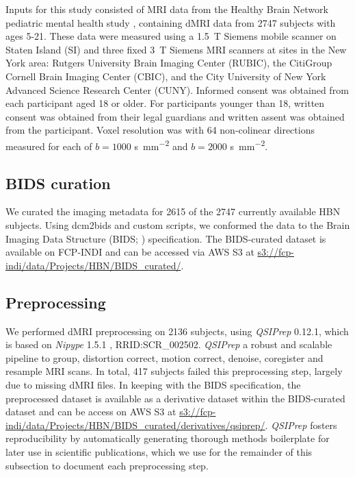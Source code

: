 \documentclass[fleqn,10pt]{wlscirep}
\begin{document}
Inputs for this study consisted of MRI data from the Healthy Brain Network
pediatric mental health study \cite{alexander2017-yc}, containing dMRI data from
\num{2747} subjects with ages 5-21. These data were measured using a
\qty{1.5}{\tesla} Siemens mobile scanner on Staten Island (SI) and three fixed
\qty{3}{\tesla} Siemens MRI scanners at sites in the New York area: Rutgers
University Brain Imaging Center (RUBIC), the CitiGroup Cornell Brain Imaging
Center (CBIC), and the City University of New York Advanced Science Research
Center (CUNY). Informed consent was obtained from each participant aged 18 or
older. For participants younger than 18, written consent was obtained from their
legal guardians and written assent was obtained from the participant. Voxel
resolution was  with \num{64} non-colinear
directions measured for each of $b=1000$ \unit{\second \per \mm^{2}} and
$b=2000$ \unit{\second \per \mm^{2}}.

\subsection*{BIDS curation}

We curated the imaging metadata for \num{2615} of the \num{2747} currently
available HBN subjects. Using dcm2bids and custom scripts, we conformed the data
to the Brain Imaging Data Structure (BIDS; \cite{gorgolewski2016-lh})
specification.  The BIDS-curated dataset is available on FCP-INDI and can be
accessed via AWS S3 at \url{s3://fcp-indi/data/Projects/HBN/BIDS_curated/}.


\subsection*{Preprocessing}

We performed dMRI preprocessing on \num{2136} subjects, using \emph{QSIPrep}
\cite{cieslak2021-iq} 0.12.1, which is based on \emph{Nipype} 1.5.1
\cite{nipype1,nipype2}, RRID:SCR\_002502. \emph{QSIPrep} a robust and scalable
pipeline to group, distortion correct, motion correct, denoise, coregister and
resample MRI scans.  In total, \num{417} subjects failed this preprocessing
step, largely due to missing dMRI files. In keeping with the BIDS specification,
the preprocessed dataset is available as a derivative dataset within the
BIDS-curated dataset and can be access on AWS S3 at
\url{s3://fcp-indi/data/Projects/HBN/BIDS_curated/derivatives/qsiprep/}.
\emph{QSIPrep} fosters reproducibility by automatically generating thorough
methods boilerplate for later use in scientific publications, which we use for
the remainder of this subsection to document each preprocessing step.
\end{document}
